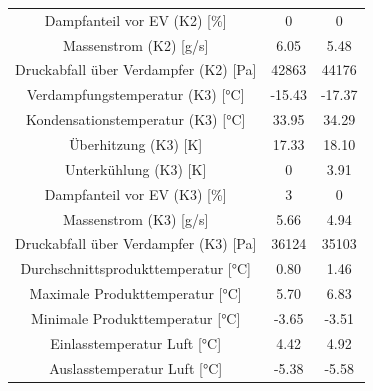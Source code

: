 \begin{table}[h!]
\begin{tabular}{|ccc|}
\multicolumn{1}{|c|}{Dampfanteil vor EV (K2) {[}\%{]}}          & \multicolumn{1}{c|}{0}      & 0             \\
\multicolumn{1}{|c|}{Massenstrom (K2) {[}g/s{]}}                & \multicolumn{1}{c|}{6.05}   & 5.48          \\
\multicolumn{1}{|c|}{Druckabfall über Verdampfer (K2) {[}Pa{]}} & \multicolumn{1}{c|}{42863}  & 44176         \\ \hline
\multicolumn{1}{|c|}{Verdampfungstemperatur (K3) {[}°C{]}}      & \multicolumn{1}{c|}{-15.43} & -17.37        \\
\multicolumn{1}{|c|}{Kondensationstemperatur (K3) {[}°C{]}}    & \multicolumn{1}{c|}{33.95}  & 34.29         \\
\multicolumn{1}{|c|}{Überhitzung (K3) {[}K{]}}                  & \multicolumn{1}{c|}{17.33}  & 18.10         \\
\multicolumn{1}{|c|}{Unterkühlung (K3) {[}K{]}}                 & \multicolumn{1}{c|}{0}      & 3.91          \\
\multicolumn{1}{|c|}{Dampfanteil vor EV (K3) {[}\%{]}}          & \multicolumn{1}{c|}{3}      & 0             \\
\multicolumn{1}{|c|}{Massenstrom (K3) {[}g/s{]}}                & \multicolumn{1}{c|}{5.66}   & 4.94          \\
\multicolumn{1}{|c|}{Druckabfall über Verdampfer (K3) {[}Pa{]}} & \multicolumn{1}{c|}{36124}  & 35103         \\ \hline
\multicolumn{1}{|c|}{Durchschnittsprodukttemperatur {[}°C{]}}   & \multicolumn{1}{c|}{0.80}   & 1.46          \\
\multicolumn{1}{|c|}{Maximale Produkttemperatur {[}°C{]}}       & \multicolumn{1}{c|}{5.70}   & 6.83          \\
\multicolumn{1}{|c|}{Minimale Produkttemperatur {[}°C{]}}       & \multicolumn{1}{c|}{-3.65}  & -3.51         \\
\multicolumn{1}{|c|}{Einlasstemperatur Luft {[}°C{]}}           & \multicolumn{1}{c|}{4.42}   & 4.92          \\
\multicolumn{1}{|c|}{Auslasstemperatur Luft {[}°C{]}}           & \multicolumn{1}{c|}{-5.38}  & -5.58         \\ \hline
\end{tabular}
\end{table}


